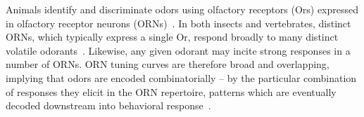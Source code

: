 


Animals identify and discriminate odors using olfactory receptors (Ors) expressed in olfactory receptor neurons (ORNs)~\cite{Or_ORNs_maps, buck1991novel}. In both insects and vertebrates, distinct ORNs, which typically express a single Or, respond broadly to many distinct volatile odorants~\cite{malnic1999combinatorial, mosquito_combinatorial_coding, hildebrand1997mechanisms, hallem_carlson, debryune_odor_coding, friedrich1997combinatorial}. Likewise, any given odorant may incite strong responses in a number of ORNs. ORN tuning curves are therefore broad and overlapping, implying that odors are encoded combinatorially -- by the particular combination of responses they elicit in the ORN repertoire, patterns which are eventually decoded downstream into behavioral response~\cite{early_olfactory_processing}.





